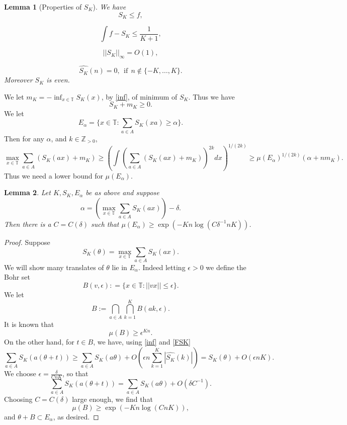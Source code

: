 \documentclass[12pt,reqno]{amsart}
\theoremstyle{dotless}
\newtheorem{lemma}{Lemma}
\begin{document}
\begin{lemma}[Properties of $S_K$]
We have 
\begin{equation}\label{min}  S_K \leq f, \end{equation}

\begin{equation}\label{intSK} \int f - S_K \leq \frac{1}{K+1}, \end{equation}


\begin{equation}\label{inf} ||S_K||_{\infty} = O(1), \end{equation}

\begin{equation}\label{FSK} \widehat{S_K}(n) = 0 , \ \ \text{if} \ \ n \notin \{-K , \ldots , K\}. \end{equation}
Moreover $S_K$ is even. 
\end{lemma}
 We let $m_K = -\inf_{x \in \mathbb{T}} S_K(x) $, by \eqref{inf}, of minimum of $S_K$. Thus we have
$$S_K + m_K \geq 0.$$
 We let 
$$E_{\alpha} = \{x \in \mathbb{T} : \sum_{a \in A} S_K(xa) \geq \alpha\}.$$ 
Then for any $\alpha$, and $k \in \mathbb{Z}_{ > 0}$,
\begin{equation}\label{mx} \max_{x \in \mathbb{T}} \sum_{a\in A} (S_K(ax)  + m_K) \geq \left( \int( \sum_{a\in A} (S_K (ax)+ m_K))^{2k}dx \right)^{1/(2k)} \geq \mu(E_{\alpha})^{1/(2k)} (\alpha + n m_K).\end{equation}
Thus we need a lower bound for $\mu(E_{\alpha})$. 

\begin{lemma}\label{meas}  Let $K, S_K,E_{\alpha}$ be as above and suppose $$\alpha = \left(\max_{x \in \mathbb{T}} \sum_{a\in A} S_K(ax)\right) - \delta.$$ Then there is a $C = C(\delta)$ such that  $\mu(E_{\alpha }) \geq  \exp(- K n  \log (C\delta^{-1}nK))$. 
\end{lemma}
\begin{proof}
Suppose 
$$S_K(\theta) = \max_{x \in \mathbb{T}} \sum_{a\in A} S_K(ax).$$ We will show many translates of $\theta$ lie in $E_{\alpha }$. Indeed letting $\epsilon >0$ we define the Bohr set 
$$B(v, \epsilon) : = \{x \in \mathbb{T} : ||vx|| \leq \epsilon\}.$$
We let 
$$B := \bigcap_{a\in A} \bigcap_{k=1}^K B(ak , \epsilon).$$
It is known \cite[Lemma 4.20]{TV} that 
$$\mu(B) \geq \epsilon^{Kn}.$$
On the other hand, for $t \in B$, we have, using \eqref{inf} and \eqref{FSK}
$$\sum_{a \in A} S_K(a(\theta +t)) \geq \sum_{a \in A}S_K(a \theta) + O(\epsilon n \sum_{k=1}^K |\widehat{S_K}(k)|) = S_K(\theta) + O(\epsilon nK).$$
We choose $\epsilon = \frac{\delta}{C nK}$, so that 
$$\sum_{a \in A} S_K(a(\theta + t) ) = \sum_{a \in A} S_K(a\theta) + O(\delta C^{-1}).$$
Choosing $C = C(\delta)$ large enough, we find that 
$$\mu(B) \geq \exp(- K n  \log (CnK)),$$
and $\theta + B \subset E_{\alpha }$, as desired. 
\end{proof} 
\end{document}
